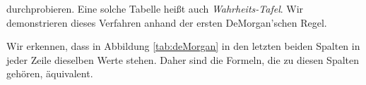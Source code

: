 durchprobieren.  Eine solche Tabelle hei\ss{}t auch \emph{\color{blue}Wahrheits-Tafel}.
Wir demonstrieren dieses Verfahren anhand der ersten DeMorgan'schen Regel.
\begin{table}[!ht]
  \centering
{}
  \caption{Nachweis der ersten DeMorgan'schen Regel.}
  \label{tab:deMorgan}
\end{table}
Wir erkennen, dass in Abbildung \ref{tab:deMorgan} in den letzten beiden Spalten in jeder Zeile dieselben Werte
stehen.  Daher sind die Formeln, die zu diesen Spalten geh\"{o}ren, \"{a}quivalent.

